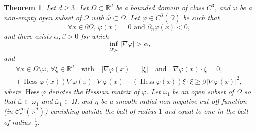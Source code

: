 \documentclass[10pt]{amsart}
\newtheorem{theo}{Theorem}[section]
\theoremstyle{definition}\newtheorem{defi}[theo]{Definition}\newtheorem{rema}[theo]{Remark}\newtheorem{exam}[theo]{Example}\newtheorem{exem}[theo]{Example}\newtheorem{nota}[theo]{Notation}
\newcommand{\scC}{\mathscr{C}}
\newcommand*\R{\mathbb{R}}
\renewcommand{\geq}{\geqslant}
\DeclareMathOperator{\Hess}{Hess}
\let\oldforall\forall
\renewcommand*{\forall}{\mathrel{\oldforall}}
\begin{document}
\begin{theo}\label{Thm-Carleman-General}
Let $d\geqslant 3$. Let $\Omega \subset \R^{d}$ be a bounded domain of class $C^3$, and $\omega$ be a non-empty open subset of $\Omega$ with $\overline \omega \subset \Omega$. Let $\varphi \in C^3(\overline{\Omega})$ be such that
\begin{equation}\label{CarlemanWeight-Cond0}
\forall x \in \partial \Omega, \, \varphi(x) = 0 \text{ and }
\partial_n \varphi(x) < 0,
\end{equation}
and there exists $\alpha, \beta > 0$ for which
\begin{equation}\label{CarlemanWeight-Cond1}
\inf_{\overline{\Omega}\setminus \omega} \vert \nabla \varphi \vert > \alpha,
\end{equation}
and
\begin{multline}\label{CarlemanWeight-Cond2}
\forall x \in \overline{\Omega} \setminus \omega, \, \forall \xi \in \R^d \quad\text{with}\quad \vert \nabla \varphi(x) \vert = \vert \xi \vert \quad\text{and}\quad \nabla \varphi(x) \cdot \xi = 0,
\\
(\Hess \varphi(x)) \nabla \varphi(x) \cdot \nabla \varphi(x) + (\Hess \varphi(x)) \xi \cdot \xi \geq \beta \vert \nabla \varphi(x) \vert^2,
\end{multline}
where $\Hess \varphi$ denotes the Hessian matrix of $\varphi$. Let $\omega_1$ be an open subset of $\Omega$ so that $\overline \omega \subset \omega_1$ and $\overline\omega_1 \subset \Omega$, and $\eta$ be a smooth radial non-negative cut-off function (in $\scC^\infty_c(\R^d)$) vanishing outside the ball of radius $1$ and equal to one in the ball of radius~$\frac{1}{2}$.


\end{theo}
\end{document}
